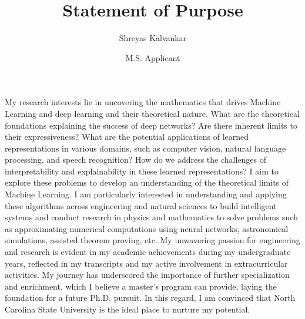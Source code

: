 \documentclass{article}
\title{Statement of Purpose}
\author{Shreyas Kalvankar}
\date{M.S. Applicant}
\begin{document}
  \maketitle%
  \thispagestyle{empty}

  \vspace{5pt}
\hspace{0.25in}My research interests lie in uncovering the mathematics that drives Machine
  Learning and deep learning and their theoretical nature. What are the
  theoretical foundations explaining the success of deep networks? Are there
  inherent limits to their expressiveness? What are the potential applications
  of learned representations in various domains, such as computer vision,
  natural language processing, and speech recognition? How do we address the
  challenges of interpretability and explainability in these learned
  representations? I aim to explore these problems to develop an understanding
  of the theoretical limits of Machine Learning. I am particularly interested in
  understanding and applying these algorithms across engineering and natural
  sciences to build intelligent systems and conduct research in physics and
  mathematics to solve problems such as approximating numerical computations
  using neural networks, astronomical simulations, assisted theorem proving,
  etc. My unwavering passion for engineering and research is evident in my
  academic achievements during my undergraduate years, reflected in my
  transcripts and my active involvement in extracurricular activities. My
  journey has underscored the importance of further specialization and
  enrichment, which I believe a master's program can provide, laying the
  foundation for a future Ph.D. pursuit. In this regard, I am convinced that
  North Carolina State University is the ideal place to nurture my potential.
\end{document}
